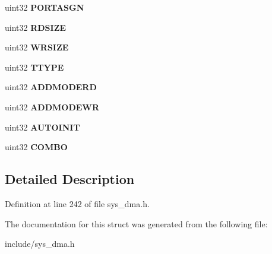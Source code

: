 \begin{DoxyCompactItemize}
uint32 {\bfseries P\+O\+R\+T\+A\+S\+GN}
\item 
\mbox{\label{structdmaCTRLPKT_ab134252c3d1b8b176be7797cb3c29c24}} 
uint32 {\bfseries R\+D\+S\+I\+ZE}
\item 
\mbox{\label{structdmaCTRLPKT_a0410ed7f72f567f8ea6d5cb66bad505d}} 
uint32 {\bfseries W\+R\+S\+I\+ZE}
\item 
\mbox{\label{structdmaCTRLPKT_a2ad3639f9f0acdb4ad95757302a7d11e}} 
uint32 {\bfseries T\+T\+Y\+PE}
\item 
\mbox{\label{structdmaCTRLPKT_a576b2d7cf84b8ee97c04825bb6bae2fb}} 
uint32 {\bfseries A\+D\+D\+M\+O\+D\+E\+RD}
\item 
\mbox{\label{structdmaCTRLPKT_a656ff611f1d7273d527659bce0472476}} 
uint32 {\bfseries A\+D\+D\+M\+O\+D\+E\+WR}
\item 
\mbox{\label{structdmaCTRLPKT_a1cd53a394e13b354ec545a9b22ab90b5}} 
uint32 {\bfseries A\+U\+T\+O\+I\+N\+IT}
\item 
\mbox{\label{structdmaCTRLPKT_afd05adfa55815ae5871c1707efc9dc2e}} 
uint32 {\bfseries C\+O\+M\+BO}
\end{DoxyCompactItemize}


\subsection{Detailed Description}


Definition at line 242 of file sys\+\_\+dma.\+h.



The documentation for this struct was generated from the following file\+:\begin{DoxyCompactItemize}
\item 
include/sys\+\_\+dma.\+h\end{DoxyCompactItemize}
